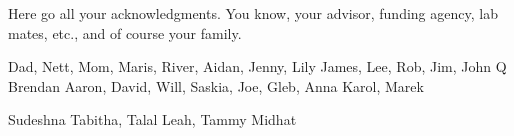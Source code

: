 
Here go all your acknowledgments. You know, your advisor, funding agency, lab
mates, etc., and of course your family.



Dad, Nett, Mom, Maris, River, Aidan, Jenny, Lily
James, Lee, Rob, Jim, John Q
Brendan
Aaron, David, Will, Saskia, Joe, Gleb, Anna
Karol, Marek


Sudeshna
Tabitha, Talal
Leah, Tammy
Midhat
